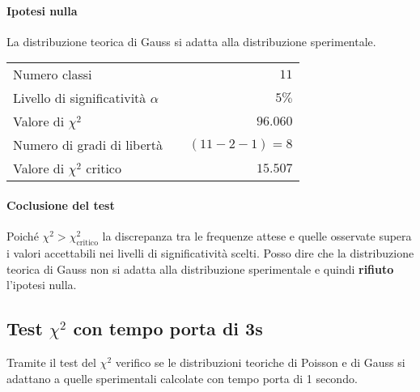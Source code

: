 \documentclass{article}
\begin{document}
\paragraph{Ipotesi nulla} La distribuzione teorica di Gauss si adatta alla distribuzione sperimentale.

\vspace{0.2cm}
\begin{center}
\begin{tabular}{lr}
	Numero classi & $11$ \\
	Livello di significatività $\alpha$		& $ \quad 5\%$  \\
	Valore di $\chi ^2$             	& $\quad 96.060$       \\
	Numero di gradi di libertà      	& $\quad (11-2-1) = 8$         \\   
	Valore di $\chi ^2$ critico     	& $\quad 15.507$
\end{tabular}
\end{center}

\paragraph{Coclusione del test} Poiché $\chi^2 > \chi^2_{\text{critico}}$ la discrepanza tra le frequenze attese e quelle osservate supera i valori accettabili nei livelli di significatività scelti. Posso dire che la distribuzione teorica di Gauss non si adatta alla distribuzione sperimentale e quindi \textbf{rifiuto} l'ipotesi nulla.

\begin{center}
\end{center}


\subsection{Test \(\chi^2\) con tempo porta di 3s}
Tramite il test del \(\chi^2\) verifico se le distribuzioni teoriche di Poisson e di Gauss si adattano a quelle sperimentali calcolate con tempo porta di 1 secondo.
\end{document}
